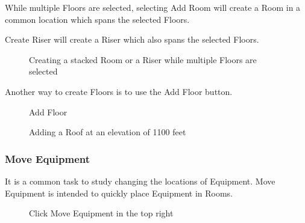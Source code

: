 \documentclass[letterpaper,10pt,english]{sphinxmanual}
\begin{document}
While multiple Floors are selected, selecting Add Room will create a Room in a common location which spans the selected Floors.

Create Riser will create a Riser which also spans the selected Floors.

\begin{figure}[H]
\centering
\capstart

\noindent{}
\caption{Creating a stacked Room or a Riser while multiple Floors are selected}\label{\detokenize{docs/userguide/definingarchitecturalelements/floorplans/index-floor-plans:id10}}\end{figure}
\label{\detokenize{docs/userguide/definingarchitecturalelements/floorplans/index-floor-plans:add-floor}}
Another way to create Floors is to use the Add Floor button.

\begin{figure}[H]
\centering
\capstart

\noindent{}
\caption{Add Floor}\label{\detokenize{docs/userguide/definingarchitecturalelements/floorplans/index-floor-plans:id11}}\end{figure}

\begin{figure}[H]
\centering
\capstart

\noindent{}
\caption{Adding a Roof at an elevation of 1100 feet}\label{\detokenize{docs/userguide/definingarchitecturalelements/floorplans/index-floor-plans:id12}}\end{figure}


\subsubsection{Move Equipment}
\label{\detokenize{docs/userguide/definingarchitecturalelements/floorplans/index-floor-plans:move-equipment}}\label{\detokenize{docs/userguide/definingarchitecturalelements/floorplans/index-floor-plans:floor-plans-move-equipment}}
It is a common task to study changing the locations of Equipment.  Move Equipment is intended to quickly place Equipment in Rooms.

\begin{figure}[H]
\centering
\capstart

\noindent{}
\caption{Click Move Equipment in the top right}\label{\detokenize{docs/userguide/definingarchitecturalelements/floorplans/index-floor-plans:id13}}\end{figure}
\end{document}
